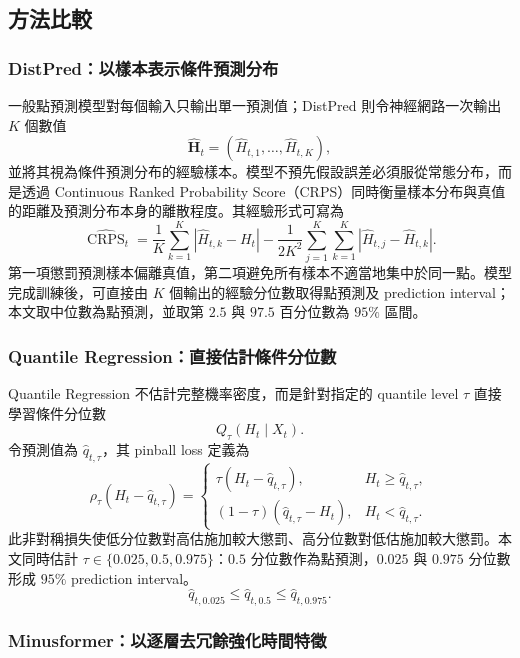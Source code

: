{\subsection*{方法比較}

\subsubsection*{DistPred：以樣本表示條件預測分布}

一般點預測模型對每個輸入只輸出單一預測值；DistPred 則令神經網路一次輸出 $K$ 個數值
\[
    \widehat{\boldsymbol H}_t
    =(\widehat H_{t,1},\ldots,\widehat H_{t,K}),
\]
並將其視為條件預測分布的經驗樣本。模型不預先假設誤差必須服從常態分布，而是透過 Continuous Ranked Probability Score（CRPS）同時衡量樣本分布與真值的距離及預測分布本身的離散程度。其經驗形式可寫為
\[
    \widehat{\operatorname{CRPS}}_t
    =\frac{1}{K}\sum_{k=1}^{K}
      |\widehat H_{t,k}-H_t|
    -\frac{1}{2K^2}\sum_{j=1}^{K}\sum_{k=1}^{K}
      |\widehat H_{t,j}-\widehat H_{t,k}|.
\]
第一項懲罰預測樣本偏離真值，第二項避免所有樣本不適當地集中於同一點。模型完成訓練後，可直接由 $K$ 個輸出的經驗分位數取得點預測及 prediction interval；本文取中位數為點預測，並取第 $2.5$ 與 $97.5$ 百分位數為 $95\%$ 區間。

\subsubsection*{Quantile Regression：直接估計條件分位數}

Quantile Regression 不估計完整機率密度，而是針對指定的 quantile level $\tau$ 直接學習條件分位數
\[
    Q_{\tau}(H_t\mid X_t).
\]
令預測值為 $\widehat q_{t,\tau}$，其 pinball loss 定義為
\[
    \rho_{\tau}(H_t-\widehat q_{t,\tau})
    =
    \begin{cases}
      \tau(H_t-\widehat q_{t,\tau}),
      & H_t\geq \widehat q_{t,\tau},\\
      (1-\tau)(\widehat q_{t,\tau}-H_t),
      & H_t<\widehat q_{t,\tau}.
    \end{cases}
\]
此非對稱損失使低分位數對高估施加較大懲罰、高分位數對低估施加較大懲罰。本文同時估計 $\tau\in\{0.025,0.5,0.975\}$：$0.5$ 分位數作為點預測，$0.025$ 與 $0.975$ 分位數形成 $95\%$ prediction interval。
\[
    \widehat q_{t,0.025}
    \leq \widehat q_{t,0.5}
    \leq \widehat q_{t,0.975}.
\]

\subsubsection*{Minusformer：以逐層去冗餘強化時間特徵}

}
